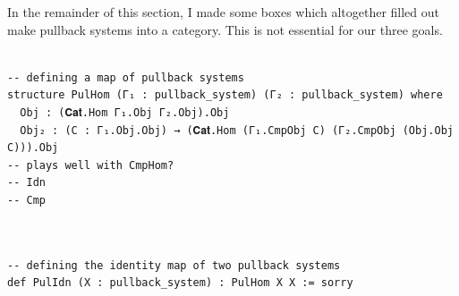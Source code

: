 \documentclass{book}
\theoremstyle{definition}
\newcounter{lcounter}
\begin{document}
{{In the remainder of this section, I made some boxes which altogether filled out make pullback systems into a category. This is not essential for our three goals.\\

\begin{center}
\begin{tcolorbox}[width=5in,colback={white},title={\begin{center}\texttt{Lean \thelcounter} \addtocounter{lcounter}{1}  \end{center}},colbacktitle=Blue,coltitle=black]
\begin{verbatim}

-- defining a map of pullback systems
structure PulHom (Γ₁ : pullback_system) (Γ₂ : pullback_system) where
  Obj : (𝐂𝐚𝐭.Hom Γ₁.Obj Γ₂.Obj).Obj
  Obj₂ : (C : Γ₁.Obj.Obj) → (𝐂𝐚𝐭.Hom (Γ₁.CmpObj C) (Γ₂.CmpObj (Obj.Obj C))).Obj
-- plays well with CmpHom?
-- Idn
-- Cmp


\end{verbatim}
\end{tcolorbox}
\end{center}

\begin{center}
\begin{tcolorbox}[width=5in,colback={white},title={\begin{center}\texttt{Lean \thelcounter} \addtocounter{lcounter}{1}  \end{center}},colbacktitle=Blue,coltitle=black]
\begin{verbatim}

-- defining the identity map of two pullback systems
def PulIdn (X : pullback_system) : PulHom X X := sorry

\end{verbatim}
\end{tcolorbox}
\end{center}

\begin{center}
\begin{tcolorbox}[width=5in,colback={white},title={\begin{center}\texttt{Lean \thelcounter} \addtocounter{lcounter}{1}  \end{center}},colbacktitle=Blue,coltitle=black]
\begin{verbatim}


\end{verbatim}
\end{tcolorbox}
\end{center}}}
\end{document}
